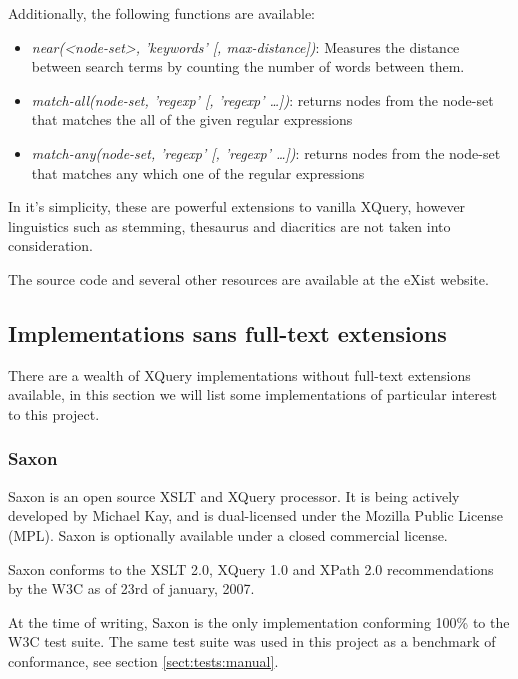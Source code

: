 Additionally, the following functions are available:
\begin{itemize}
  \item \emph{near(<node-set>, 'keywords' [, max-distance])}: Measures the 
  distance between search terms by counting the number of words between 
  them.
  \item \emph{match-all(node-set, 'regexp' [, 'regexp' \ldots])}: returns
  nodes from the node-set that matches the all of the given regular expressions 
  \item \emph{match-any(node-set, 'regexp' [, 'regexp' \ldots])}: returns nodes
  from the node-set that matches any which one of the regular expressions
\end{itemize}

In it's simplicity, these are powerful extensions to vanilla XQuery, however
linguistics such as stemming, thesaurus and diacritics are not taken into
consideration.

The source code and several other resources are available at the eXist
website\cite{existweb}. 

\subsection{Implementations sans full-text extensions}
There are a wealth of XQuery implementations without full-text
extensions available, in this section we will list some implementations of
particular interest to this project.
\subsubsection{Saxon}
Saxon is an open source XSLT and XQuery processor. It is being actively
developed by Michael Kay, and is dual-licensed under the Mozilla Public License
(MPL). Saxon is optionally available under a closed commercial license.

Saxon conforms to the XSLT 2.0, XQuery 1.0 and XPath 2.0 recommendations
by the W3C as of 23rd of january, 2007. 

At the time of writing, Saxon is the only implementation conforming 100\% to
the W3C test suite\cite{w3ctestresults}. The same test suite was used in this
project as a benchmark of conformance, see section \ref{sect:tests:manual}.

